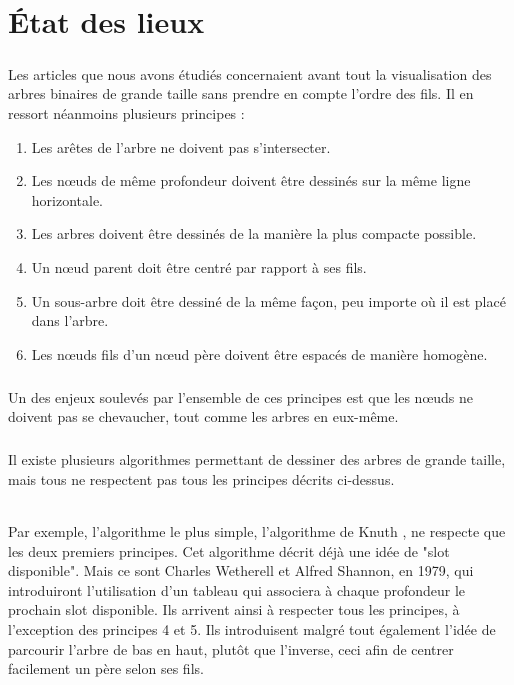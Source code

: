 \chapter{État des lieux}

\paragraph{}Les articles que nous avons étudiés concernaient avant tout la visualisation des arbres binaires de grande taille sans prendre en compte l'ordre des fils. Il en ressort néanmoins plusieurs principes :
\begin{enumerate}
	\item Les arêtes de l'arbre ne doivent pas s'intersecter.
	\item Les n\oe{}uds de même profondeur doivent être dessinés sur la même ligne horizontale.
	\item Les arbres doivent être dessinés de la manière la plus compacte possible.
	\item Un n\oe{}ud parent doit être centré par rapport à ses fils.
	\item Un sous-arbre doit être dessiné de la même façon, peu importe où il est placé dans l'arbre.
	\item Les n\oe{}uds fils d'un n\oe{}ud père doivent être espacés de manière homogène.
\end{enumerate}

\paragraph{}Un des enjeux soulevés par l'ensemble de ces principes est que les n\oe{}uds ne doivent pas se chevaucher, tout comme les arbres en eux-même.

\paragraph{}Il existe plusieurs algorithmes permettant de dessiner des arbres de grande taille, mais tous ne respectent pas tous les principes décrits ci-dessus.

\subparagraph{}Par exemple, l'algorithme le plus simple, l'algorithme de Knuth \cite{REF_Knuth}, ne respecte que les deux premiers principes. Cet algorithme décrit déjà une idée de "slot disponible". Mais ce sont Charles Wetherell et Alfred Shannon, en 1979, qui introduiront l'utilisation d'un tableau qui associera à chaque profondeur le prochain slot disponible. Ils arrivent ainsi à respecter tous les principes, à l'exception des principes 4 et 5. Ils introduisent malgré tout également l'idée de parcourir l'arbre de bas en haut, plutôt que l'inverse, ceci afin de centrer facilement un père selon ses fils.

